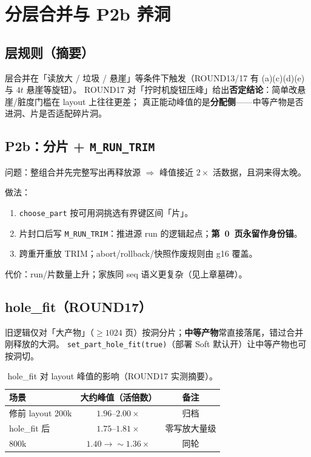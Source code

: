 \section{分层合并与 P2b 养洞}
\label{sec:merge}

\subsection{层规则（摘要）}
层合并在「读放大 / 垃圾 / 悬崖」等条件下触发（ROUND13/17 有 (a)(c)(d)(e) 与 $4t$ 悬崖等旋钮）。
ROUND17 对「拧时机旋钮压峰」给出\textbf{否定结论}：简单改悬崖/脏度门槛在 layout 上往往更差；
真正能动峰值的是\textbf{分配侧}——中等产物是否进洞、片是否适配碎片洞。

\subsection{P2b：分片 + \texttt{M\_RUN\_TRIM}}
问题：整组合并先完整写出再释放源 $\Rightarrow$ 峰值接近 $2\times$ 活数据，且洞来得太晚。

做法：
\begin{enumerate}[leftmargin=1.8em]
  \item \texttt{choose\_part} 按可用洞挑选有界键区间「片」。
  \item 片封口后写 \texttt{M\_RUN\_TRIM}：推进源 run 的逻辑起点；\textbf{第~0~页永留作身份锚}。
  \item 跨重开重放 TRIM；abort/rollback/快照作废规则由 g16 覆盖。
\end{enumerate}

代价：run/片数量上升；家族同 seq 语义更复杂（见上章墓碑）。

\subsection{hole\_fit（ROUND17）}
旧逻辑仅对「大产物」（$\ge 1024$ 页）按洞分片；\textbf{中等产物}常直接落尾，错过合并刚释放的大洞。
\texttt{set\_part\_hole\_fit(true)}（部署 Soft 默认开）让中等产物也可按洞切。

\begin{table}[ht]
\centering
\small
\begin{tabular}{@{}lcc@{}}
\toprule
场景 & 大约峰值（活倍数） & 备注 \\
\midrule
修前 layout 200k & $1.96$--$2.00\times$ & 归档 \\
hole\_fit 后 & $1.75$--$1.81\times$ & 零写放大量级 \\
800k & $1.40\to\sim1.36\times$ & 同轮 \\
\bottomrule
\end{tabular}
\caption{hole\_fit 对 layout 峰值的影响（ROUND17 实测摘要）。}
\end{table}

